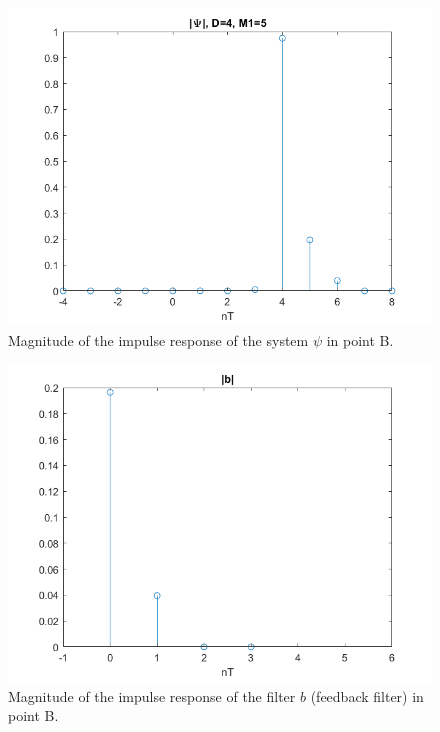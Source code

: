 \documentclass[a4paper,11.5pt]{article}
\begin{document}
\begin{figure}[H]
	\begin{center}   
		\includegraphics[width=\textwidth]{figs/B_psi.png} 
		\caption{Magnitude of the impulse response of the system $\psi$ in point B.}
		\label{fig:B_psi}
	\end{center}
\end{figure}

\begin{figure}[H]
	\begin{center}   
		\includegraphics[width=\textwidth]{figs/B_b.png} 
		\caption{Magnitude of the impulse response of the filter $b$ (feedback filter) in point B.}
		\label{fig:B_b}
	\end{center}
\end{figure}
\end{document}
